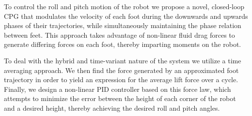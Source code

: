 To control the roll and pitch motion of the robot we propose a novel, closed-loop CPG that modulates the velocity of each foot during the downwards and upwards phases of their trajectories, while simultaneously maintaining the phase relation between feet. This approach takes advantage of non-linear fluid drag forces to generate differing forces on each foot, thereby imparting moments on the robot. 
	
To deal with the hybrid and time-variant nature of the system we utilize a time averaging approach. We then find the force generated by an approximated foot trajectory in order to yield an expression for the average lift force over a cycle. Finally, we design a non-linear PID controller based on this force law, which attempts to minimize the error between the height of each corner of the robot and a desired height, thereby achieving the desired roll and pitch angles.
